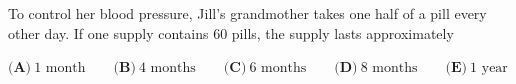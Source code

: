 To control her blood pressure, Jill's grandmother takes one half of a pill every other day. If one supply contains $60$ pills, the supply lasts approximately

$\textbf{(A)}\ 1\text{ month}\qquad\textbf{(B)}\ 4\text{ months}\qquad\textbf{(C)}\ 6\text{ months}\qquad\textbf{(D)}\ 8\text{ months}\qquad\textbf{(E)}\ 1\text{ year}$
